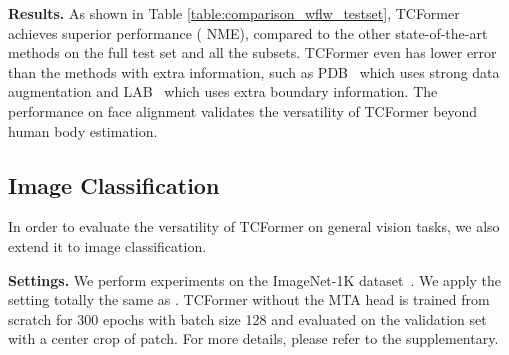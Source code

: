 \documentclass[10pt,twocolumn,letterpaper]{article}
\begin{document}
\textbf{Results.}
As shown in Table \ref{table:comparison_wflw_testset}, TCFormer achieves superior performance ( NME), compared to the other state-of-the-art methods on the full test set and all the subsets. TCFormer even has lower error than the methods with extra information, such as PDB~\cite{feng2018wing} which uses strong data augmentation and LAB~\cite{wu2018look} which uses extra boundary information. 
The performance on face alignment validates the versatility of TCFormer beyond human body estimation. 


\begin{table}[t]
    \centering
    \caption{Evaluation on ImageNet-1k \texttt{val}. 
    All results are obtained using the input size of . 
    }
    \small
    \label{tab:cls}
    \setlength{\tabcolsep}{1.7mm}
    \vspace{-5pt}
\end{table}


\subsection{Image Classification}
In order to evaluate the versatility of TCFormer on general vision tasks, we also extend it  to image classification.

\textbf{Settings.} 
We perform experiments on the ImageNet-1K dataset~\cite{russakovsky2015imagenet}. 
We apply the setting totally the same as \cite{pvt}. TCFormer without the MTA head is trained from scratch for 300 epochs with batch size 128 and evaluated on the validation set with a center crop of  patch.
For more details, please refer to the supplementary.
\end{document}
